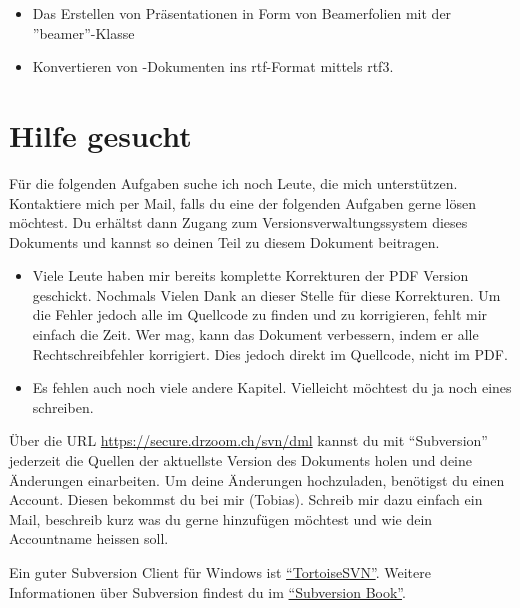\begin{itemize}
	\item Das Erstellen von Präsentationen in Form von Beamerfolien mit der ''beamer''-Klasse
	\item Konvertieren von \DMLLaTeX-Dokumenten ins rtf-Format mittels rtf3\DMLLaTeX.
\end{itemize}

\section{Hilfe gesucht}
\label{sec:hilfe-gesucht}

Für die folgenden Aufgaben suche ich noch Leute, die mich unterstützen. Kontaktiere mich per Mail, falls du eine der folgenden Aufgaben gerne lösen möchtest. Du erhältst dann Zugang zum Versionsverwaltungssystem dieses Dokuments und kannst so deinen Teil zu diesem Dokument beitragen.

\begin{itemize}
	\item Viele Leute haben mir bereits komplette Korrekturen der PDF Version geschickt. Nochmals Vielen Dank an dieser Stelle für
	diese Korrekturen. Um die Fehler jedoch alle im Quellcode zu finden und zu korrigieren, fehlt mir einfach die Zeit. Wer mag, kann
	das Dokument verbessern, indem er alle Rechtschreibfehler korrigiert. Dies jedoch direkt im Quellcode, nicht im PDF.
	\item Es fehlen auch noch viele andere Kapitel. Vielleicht möchtest du ja noch eines schreiben.
\end{itemize}

Über die URL \href{https://secure.drzoom.ch/svn/dml}{https://secure.drzoom.ch/svn/dml} kannst du mit \enquote{Subversion} jederzeit die Quellen der aktuellste Version des Dokuments holen und deine Änderungen einarbeiten. Um deine Änderungen hochzuladen, benötigst du einen Account. Diesen bekommst du bei mir (Tobias). Schreib mir dazu einfach ein Mail, beschreib kurz was du gerne hinzufügen möchtest und wie dein Accountname heissen soll.

Ein guter Subversion Client für Windows ist \href{http://tortoisesvn.tigris.org/}{\enquote{TortoiseSVN}}. Weitere Informationen über Subversion findest du im \href{http://svnbook.red-bean.com/}{\enquote{Subversion Book}}.

